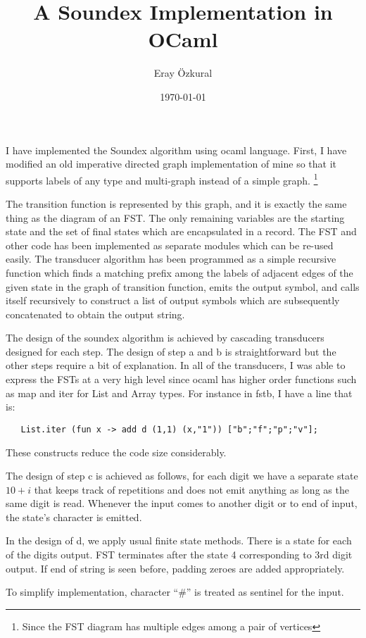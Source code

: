 \documentclass[a4paper,11pt]{article}
\title{ A Soundex Implementation in OCaml }
\author{Eray \"Ozkural}
\date{\today}
\begin{document}
\maketitle

I have implemented the Soundex algorithm using ocaml language. First,
I have modified an old imperative directed graph implementation of
mine so that it supports labels of any type and multi-graph instead of
a simple graph.  \footnote{Since the FST diagram has multiple edges
  among a pair of vertices}

The transition function is represented by this graph, and it is
exactly the same thing as the diagram of an FST. The only remaining
variables are the starting state and the set of final states which are
encapsulated in a record. The FST and other code has been implemented
as separate modules which can be re-used easily. The transducer
algorithm has been programmed as a simple recursive function which
finds a matching prefix among the labels of adjacent edges of the
given state in the graph of transition function, emits the output
symbol, and calls itself recursively to construct a list of output
symbols which are subsequently concatenated to obtain the output
string.

The design of the soundex algorithm is achieved by cascading
transducers designed for each step. The design of step a and b is
straightforward but the other steps require a bit of
explanation. In all of the transducers, I was able to express the FSTs
at a very high level since ocaml has higher order functions such as
map and iter for List and Array types. For
instance in fstb, I have a line that is:
\begin{verbatim}
   List.iter (fun x -> add d (1,1) (x,"1")) ["b";"f";"p";"v"];
\end{verbatim}
These constructs reduce the code size considerably.

The design of step c is achieved as follows, for each digit we have a
separate state $10+i$ that keeps track of repetitions and does not
emit anything as long as the same digit is read. Whenever the input
comes to another digit or to end of input, the state's character
is emitted.

In the design of d, we apply usual finite state methods. There is a
state for each of the digits output. FST terminates after the state 4
corresponding to 3rd digit output. If end of string is seen before,
padding zeroes are added appropriately.

To simplify implementation, character ``\#'' is treated as sentinel
for the input.
\end{document}
